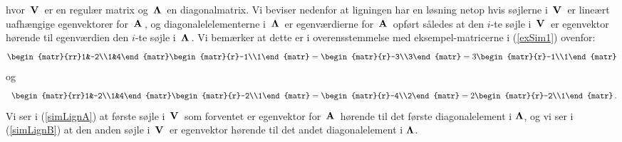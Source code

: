 hvor $\,\mathbf{V}\,$ er en regulær matrix og $\,\bm{\Lambda}\,$ en diagonalmatrix. Vi beviser nedenfor at ligningen har en løsning netop hvis søjlerne i $\,\mathbf{V}\,$ er lineært uafhængige egenvektorer for $\,\mathbf{A}\,$, og diagonalelelementerne i $\,\bm{\Lambda}\,$ er egenværdierne for $\,\mathbf{A}\,$ opført således at den $i$-te søjle i $\,\mathbf{V}\,$ er egenvektor hørende til egenværdien den $i$-te søjle i $\,\bm{\Lambda}\,$.\bs
Vi bemærker at dette er i overensstemmelse med eksempel-matricerne i (\ref{exSim1}) ovenfor:
\begin{equation}\label{simLignA}
\begin{matr}{rr}1&-2\\1&4\end{matr}
\begin{matr}{r}-1\\1\end{matr}=
\begin{matr}{r}-3\\3\end{matr}=
3\begin{matr}{r}-1\\1\end{matr}\end{equation}
og
\begin{equation}\label{simLignB}
{\,\,\,}\begin{matr}{rr}1&-2\\1&4\end{matr}
\begin{matr}{r}-2\\1\end{matr}=
\begin{matr}{r}-4\\2\end{matr}=
2\begin{matr}{r}-2\\1\end{matr}\,.\end{equation}
Vi ser i (\ref{simLignA}) at første søjle i $\,\mathbf{V}\,$ som forventet er egenvektor for $\,\mathbf{A}\,$ hørende til det første diagonalelement i $\bm{\Lambda}$, og vi ser i (\ref{simLignB}) at den anden søjle i $\,\mathbf{V}\,$ er egenvektor hørende til det andet diagonalelement i $\bm{\Lambda}$.


